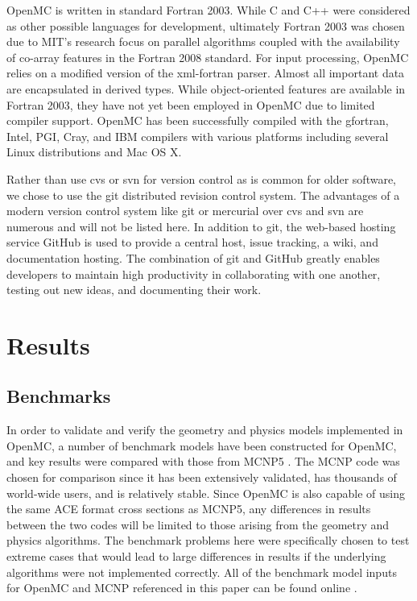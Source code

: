 \documentclass[authoryear,preprint]{elsarticle}
\begin{document}
OpenMC is written in standard Fortran 2003. While C and C++ were considered as
other possible languages for development, ultimately Fortran 2003 was chosen due
to MIT's research focus on parallel algorithms coupled with the availability of
co-array features in the Fortran 2008 standard. For input processing, OpenMC
relies on a modified version of the xml-fortran \citep{xml-fortran}
parser. Almost all important data are encapsulated in derived types. While
object-oriented features are available in Fortran 2003, they have not yet been
employed in OpenMC due to limited compiler support. OpenMC has been successfully
compiled with the gfortran, Intel, PGI, Cray, and IBM compilers with various
platforms including several Linux distributions and Mac OS X.

Rather than use cvs or svn for version control as is common for older software,
we chose to use the git distributed revision control system. The advantages of a
modern version control system like git or mercurial over cvs and svn are
numerous and will not be listed here. In addition to git, the web-based hosting
service GitHub is used to provide a central host, issue tracking, a wiki, and
documentation hosting. The combination of git and GitHub greatly enables
developers to maintain high productivity in collaborating with one another,
testing out new ideas, and documenting their work.

\section{Results}

\subsection{Benchmarks}

In order to validate and verify the geometry and physics models implemented in
OpenMC, a number of benchmark models have been constructed for OpenMC, and key
results were compared with those from MCNP5 \citep{mcnp}. The MCNP code was
chosen for comparison since it has been extensively validated, has thousands of
world-wide users, and is relatively stable. Since OpenMC is also capable of
using the same ACE format cross sections as MCNP5, any differences in results
between the two codes will be limited to those arising from the geometry and
physics algorithms. The benchmark problems here were specifically chosen to test
extreme cases that would lead to large differences in results if the underlying
algorithms were not implemented correctly. All of the benchmark model inputs for
OpenMC and MCNP referenced in this paper can be found online \citep{benchmarks}.
\end{document}
